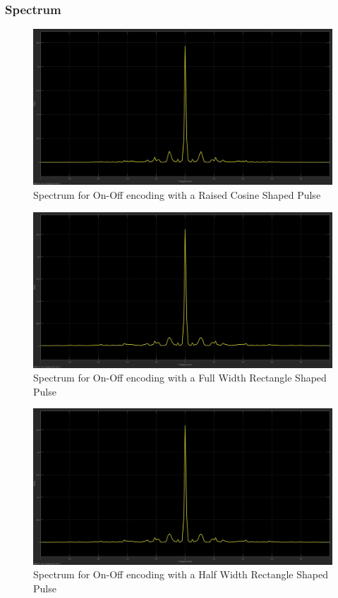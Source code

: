 \documentclass{article}
\begin{document}
\subsubsection{Spectrum}
\begin{figure}[H]
  \includegraphics[width = \linewidth]{OO_Rasied_Spectrum.jpg}
  \caption{Spectrum for On-Off encoding with a Raised Cosine Shaped Pulse}
  \label{fig:OO-Raised-Spectrum}
\end{figure}
\begin{figure}[H]
  \includegraphics[width = \linewidth]{OO_Rect_F_Spectrum.jpg}
  \caption{Spectrum for On-Off encoding with a Full Width Rectangle Shaped Pulse}
  \label{fig:OO-Rect-F-Spectrum}
\end{figure}
\begin{figure}[H]
  \includegraphics[width = \linewidth]{OO_Rect_H_Spectrum.jpg}
  \caption{Spectrum for On-Off encoding with a Half Width Rectangle Shaped Pulse}
  \label{fig:OO-Rect-H-Spectrum}
\end{figure}
\end{document}
